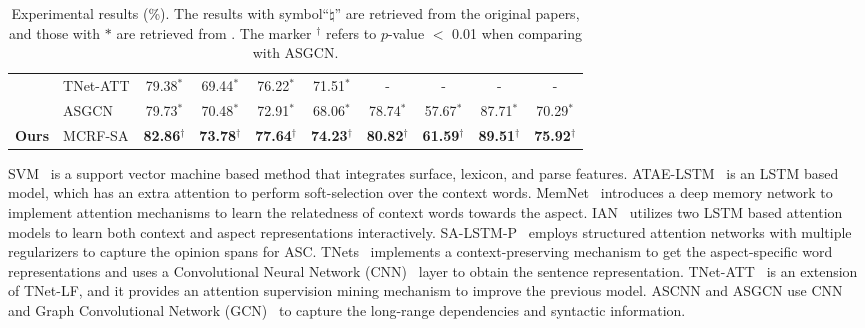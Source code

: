 \documentclass[11pt,a4paper]{article}
\begin{document}
\begin{table*}[!t]
{\begin{tabular}{llcccccccc}
        &TNet-ATT \cite{Tang:ACL2019}&79.38{\color{white}$^*$} &69.44{\color{white}$^*$}&76.22{\color{white}$^*$}&71.51{\color{white}$^*$}&-&-&-&-\\
        &ASGCN \cite{zhang-etal-2019-aspect} & 79.73{\color{white}$^*$}& 70.48{\color{white}$^*$} & 72.91{\color{white}$^*$} & 68.06{\color{white}$^*$} & 78.74{\color{white}$^*$}& 57.67{\color{white}$^*$}& 87.71{\color{white}$^*$}& 70.29{\color{white}$^*$}\\ \hline
        {\textbf{Ours}}& MCRF-SA & \textbf{82.86$^{\dag}$} & \textbf{73.78$^{\dag}$} & \textbf{77.64$^{\dag}$} & \textbf{74.23$^{\dag}$} & \textbf{80.82$^{\dag}$} & \textbf{61.59$^{\dag}$} & \textbf{89.51$^{\dag}$} & \textbf{75.92$^{\dag}$}\\ 
\bottomrule
    \end{tabular}}
\caption{Experimental results (\%). The results with symbol``$\natural$'' are retrieved from the original papers, and those with $*$ are retrieved from \citet{zhang-etal-2019-aspect}. The marker $^{\dag}$ refers to $p$-value $<$ 0.01 when comparing with ASGCN.}
    \label{tab:main_results}
\end{table*}
SVM~\cite{kiritchenko-EtAl:2014:SemEval} is a support vector machine based method that integrates surface, lexicon, and parse features.
ATAE-LSTM~\cite{wang-etal-2016-attention} is an LSTM \cite{lstm} based model, which has an extra attention to perform soft-selection over the context words.
MemNet~\cite{Tang2016AspectLS} introduces a deep memory network to implement attention mechanisms to learn the relatedness of context words towards the aspect.
IAN~\cite{Ma2017InteractiveAN}  utilizes two LSTM based attention models to learn both context and aspect representations interactively.
SA-LSTM-P~\cite{bailin-lu:2018:AAAI2018} employs structured attention networks with multiple regularizers to capture the opinion spans for ASC. 
TNets~\cite{lixin2018P18-1087} implements a context-preserving mechanism to get the aspect-specific word representations and uses a Convolutional Neural Network (CNN)~\cite{cnn} layer to obtain the sentence representation.
TNet-ATT~\cite{Tang:ACL2019} is an extension of TNet-LF, and it provides an attention supervision mining mechanism to improve the previous model. 
ASCNN and ASGCN \cite{zhang-etal-2019-aspect} use CNN and Graph Convolutional Network (GCN)~\cite{kipf2017semi} to capture the long-range dependencies and syntactic information.
 
\end{document}
